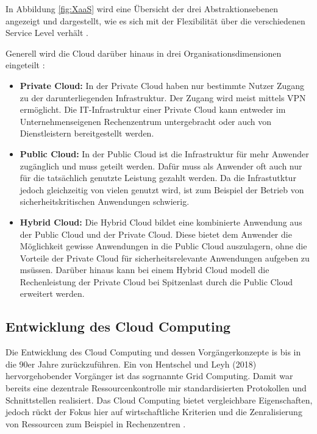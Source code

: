 In Abbildung \ref{fig:XaaS} wird eine Übersicht der drei Abstraktionsebenen angezeigt und dargestellt, wie es sich mit der Flexibilität über die verschiedenen
Service Level verhält \cite[Vgl.][S. 33]{Maenhaut2016}.

Generell wird die Cloud darüber hinaus in drei Organisationsdimensionen eingeteilt \cite[Vgl. auch im Folgenden][S. 7ff]{Reinheimer2018}:
\begin{itemize}
\item \textbf{Private Cloud:} In der Private Cloud haben nur bestimmte Nutzer Zugang zu der darunterliegenden Infrastruktur. Der Zugang wird meist mittels
\ac{VPN} ermöglicht. Die IT-Infrastruktur einer Private Cloud kann entweder im Unternehmenseigenen Rechenzentrum untergebracht oder auch
von Dienstleistern bereitgestellt werden.
\item \textbf{Public Cloud:} In der Public Cloud ist die Infrastruktur für mehr Anwender zugänglich und muss geteilt werden. Dafür muss als Anwender oft
auch nur für die tatsächlich genutzte Leistung gezahlt werden. Da die Infrastutktur jedoch gleichzeitig von vielen genutzt wird, ist zum Beispiel der
Betrieb von sicherheitskritischen Anwendungen schwierig.
\item \textbf{Hybrid Cloud:} Die Hybrid Cloud bildet eine kombinierte Anwendung aus der Public Cloud und der Private Cloud. Diese bietet dem Anwender die
Möglichkeit gewisse Anwendungen in die Public Cloud auszulagern, ohne die Vorteile der Private Cloud für sicherheitsrelevante Anwendungen aufgeben zu msüssen.
Darüber hinaus kann bei einem Hybrid Cloud modell die Rechenleistung der Private Cloud bei Spitzenlast durch die Public Cloud erweitert werden. 
\end{itemize}

\pagebreak

\subsection{Entwicklung des Cloud Computing}

Die Entwicklung des Cloud Computing und dessen Vorgängerkonzepte is bis in die 90er Jahre zurückzuführen.
Ein von Hentschel und Leyh (2018) hervorgehobender Vorgänger ist das sogrnannte Grid Computing.
Damit war bereits eine dezentrale Ressourcenkontrolle mir standardisierten Protokollen und
Schnittstellen realisiert. Das Cloud Computing bietet vergleichbare Eigenschaften, jedoch rückt der
Fokus hier auf wirtschaftliche Kriterien und die Zenralisierung von Ressourcen zum Beispiel in
Rechenzentren \cite[Vgl.][S. 5f]{Reinheimer2018}.

